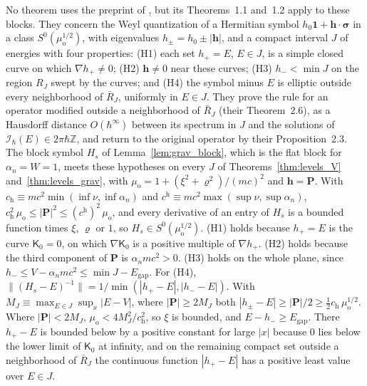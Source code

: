 \documentclass[aps,prd,onecolumn,tightenlines,nofootinbib,notitlepage,11pt,floatfix]{revtex4-2}
\theoremstyle{indentedtheorem}
\begin{document}
No theorem uses the preprint of \citet{BeckerFujiieWittsten2025Bohr}, but its Theorems~1.1 and~1.2 apply to these blocks. They concern the Weyl quantization of a Hermitian symbol $h_0\mathbf{1}+\mathbf{h}\cdot\boldsymbol{\sigma}$ in a class $S^0(\mu_\text{o}^{1/2})$, with eigenvalues $h_\pm=h_0\pm|\mathbf{h}|$, and a compact interval $J$ of energies with four properties: (H1) each set $h_+=E$, $E\in J$, is a simple closed curve on which $\nabla h_+\neq0$; (H2) $\mathbf{h}\neq0$ near these curves; (H3) $h_-<\min J$ on the region $R_J$ swept by the curves; and (H4) the symbol minus $E$ is elliptic outside every neighborhood of $\bar{R}_J$, uniformly in $E\in J$. They prove the rule for an operator modified outside a neighborhood of $\bar{R}_J$ (their Theorem~2.6), as a Hausdorff distance $O(\hbar^\infty)$ between its spectrum in $J$ and the solutions of $\mathcal{I}_\hbar(E)\in2\pi\hbar\mathbb{Z}$, and return to the original operator by their Proposition~2.3. The block symbol $H_s$ of Lemma~\ref{lem:grav_block}, which is the flat block for $\alpha_n=W=1$, meets these hypotheses on every $J$ of Theorems~\ref{thm:levels_V} and~\ref{thm:levels_grav}, with $\mu_\text{o}=1+(\xi^2+\varrho^2)/(mc)^2$ and $\mathbf{h}=\mathbf{P}$. With $c_\text{h}\equiv mc^2\min(\inf\nu,\inf\alpha_n)$ and $c^\text{h}\equiv mc^2\max(\sup\nu,\sup\alpha_n)$, $c_\text{h}^2\,\mu_\text{o}\le|\mathbf{P}|^2\le(c^\text{h})^2\,\mu_\text{o}$, and every derivative of an entry of $H_s$ is a bounded function times $\xi$, $\varrho$ or $1$, so $H_s\in S^0(\mu_\text{o}^{1/2})$. (H1) holds because $h_+=E$ is the curve $\mathsf{K}_0=0$, on which $\nabla\mathsf{K}_0$ is a positive multiple of $\nabla h_+$. (H2) holds because the third component of $\mathbf{P}$ is $\alpha_nmc^2>0$. (H3) holds on the whole plane, since $h_-\le V-\alpha_nmc^2\le\min J-E_\text{gap}$. For (H4), $\|(H_s-E)^{-1}\|=1/\min(|h_+-E|,|h_--E|)$. With $M_J\equiv\max_{E\in J}\sup_x|E-V|$, where $|\mathbf{P}|\ge2M_J$ both $|h_\pm-E|\ge|\mathbf{P}|/2\ge\tfrac{1}{2}c_\text{h}\,\mu_\text{o}^{1/2}$. Where $|\mathbf{P}|<2M_J$, $\mu_\text{o}<4M_J^2/c_\text{h}^2$, so $\xi$ is bounded, and $E-h_-\ge E_\text{gap}$. There $h_+-E$ is bounded below by a positive constant for large $|x|$ because $0$ lies below the lower limit of $\mathsf{K}_0$ at infinity, and on the remaining compact set outside a neighborhood of $\bar{R}_J$ the continuous function $|h_+-E|$ has a positive least value over $E\in J$.
\end{document}
